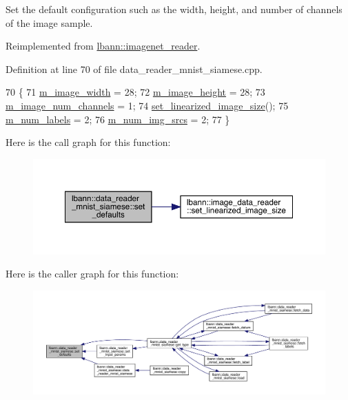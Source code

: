 Set the default configuration such as the width, height, and number of channels of the image sample. 

Reimplemented from \hyperlink{classlbann_1_1imagenet__reader_ad1e108315d659509a3e166c2f8a4941f}{lbann\+::imagenet\+\_\+reader}.



Definition at line 70 of file data\+\_\+reader\+\_\+mnist\+\_\+siamese.\+cpp.


\begin{DoxyCode}
70                                              \{
71   \hyperlink{classlbann_1_1image__data__reader_af001f3d1c0f1c580b66988233b3a64f0}{m\_image\_width} = 28;
72   \hyperlink{classlbann_1_1image__data__reader_a0632efa3deaa9d61e671f741909eb3fe}{m\_image\_height} = 28;
73   \hyperlink{classlbann_1_1image__data__reader_aab1a440f361521dc7bd583cefe1061f8}{m\_image\_num\_channels} = 1;
74   \hyperlink{classlbann_1_1image__data__reader_a0164b0e3abbe92daef73b36fb925403e}{set\_linearized\_image\_size}();
75   \hyperlink{classlbann_1_1image__data__reader_af280e8758a6ec3acee7c62e6351d17e0}{m\_num\_labels} = 2;
76   \hyperlink{classlbann_1_1data__reader__multi__images_a70752a5442e99333fec52def9eadc58f}{m\_num\_img\_srcs} = 2;
77 \}
\end{DoxyCode}
Here is the call graph for this function\+:\nopagebreak
\begin{figure}[H]
\begin{center}
\leavevmode
\includegraphics[width=350pt]{classlbann_1_1data__reader__mnist__siamese_a7e1c9530b5d56a0835db8a30af980164_cgraph}
\end{center}
\end{figure}
Here is the caller graph for this function\+:\nopagebreak
\begin{figure}[H]
\begin{center}
\leavevmode
\includegraphics[width=350pt]{classlbann_1_1data__reader__mnist__siamese_a7e1c9530b5d56a0835db8a30af980164_icgraph}
\end{center}
\end{figure}
